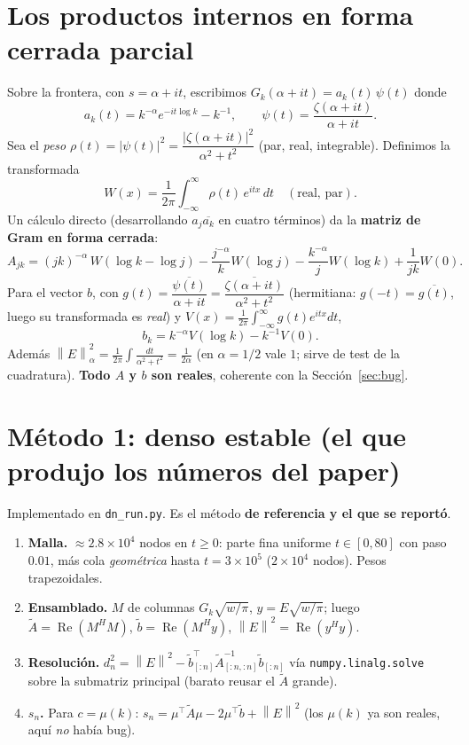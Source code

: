 \documentclass[11pt]{article}
\newcommand{\Reop}{\operatorname{Re}}
\newcommand{\norm}[1]{\left\|#1\right\|}
\newcommand{\code}[1]{\texttt{#1}}
\begin{document}
\section{Los productos internos en forma cerrada parcial}
\label{sec:formulas}

Sobre la frontera, con $s=\alpha+it$, escribimos $G_k(\alpha+it)=a_k(t)\,\psi(t)$ donde
\[
a_k(t)=k^{-\alpha}e^{-it\log k}-k^{-1},\qquad \psi(t)=\frac{\zeta(\alpha+it)}{\alpha+it}.
\]
Sea el \emph{peso} $\rho(t)=|\psi(t)|^2=\dfrac{|\zeta(\alpha+it)|^2}{\alpha^2+t^2}$ (par,
real, integrable). Definimos la transformada
\[
W(x)=\frac1{2\pi}\int_{-\infty}^{\infty}\rho(t)\,e^{itx}\,dt\quad(\text{real, par}).
\]
Un c\'alculo directo (desarrollando $a_j\overline{a_k}$ en cuatro t\'erminos) da la
\textbf{matriz de Gram en forma cerrada}:
\[
A_{jk}=(jk)^{-\alpha}\,W(\log k-\log j)
-\frac{j^{-\alpha}}{k}W(\log j)
-\frac{k^{-\alpha}}{j}W(\log k)
+\frac{1}{jk}W(0).
\]
Para el vector $b$, con $g(t)=\dfrac{\overline{\psi(t)}}{\alpha+it}
=\dfrac{\overline{\zeta(\alpha+it)}}{\alpha^2+t^2}$ (hermitiana: $g(-t)=\overline{g(t)}$,
luego su transformada es \emph{real}) y
$V(x)=\frac1{2\pi}\int_{-\infty}^{\infty}g(t)e^{itx}dt$,
\[
b_k=k^{-\alpha}V(\log k)-k^{-1}V(0).
\]
Adem\'as $\norm{E}_\alpha^2=\frac1{2\pi}\int\frac{dt}{\alpha^2+t^2}=\frac1{2\alpha}$
(en $\alpha=1/2$ vale $1$; sirve de test de la cuadratura). \textbf{Todo $A$ y $b$ son
reales}, coherente con la Secci\'on~\ref{sec:bug}.

\section{M\'etodo 1: denso estable (el que produjo los n\'umeros del paper)}
\label{sec:denso}

Implementado en \code{dn\_run.py}. Es el m\'etodo \textbf{de referencia y el que se
report\'o}.
\begin{enumerate}[leftmargin=*]
  \item \textbf{Malla.} $\approx2.8\times10^4$ nodos en $t\ge0$: parte fina uniforme
        $t\in[0,80]$ con paso $0.01$, m\'as cola \emph{geom\'etrica} hasta
        $t=3\times10^5$ ($2\times10^4$ nodos). Pesos trapezoidales.
  \item \textbf{Ensamblado.} $M$ de columnas $G_k\sqrt{w/\pi}$, $y=E\sqrt{w/\pi}$;
        luego $\tilde A=\Reop(M^HM)$, $\tilde b=\Reop(M^Hy)$,
        $\norm{E}^2=\Reop(y^Hy)$.
  \item \textbf{Resoluci\'on.} $d_n^2=\norm{E}^2-\tilde b_{[:n]}^{\top}
        \tilde A_{[:n,:n]}^{-1}\tilde b_{[:n]}$ v\'ia \code{numpy.linalg.solve}
        sobre la submatriz principal (barato reusar el $\tilde A$ grande).
  \item \textbf{$s_n$.} Para $c=\mu(k)$: $s_n=\mu^{\top}\tilde A\mu-2\mu^{\top}\tilde b+\norm{E}^2$
        (los $\mu(k)$ ya son reales, aqu\'i \emph{no} hab\'ia bug).
\end{enumerate}
\end{document}
